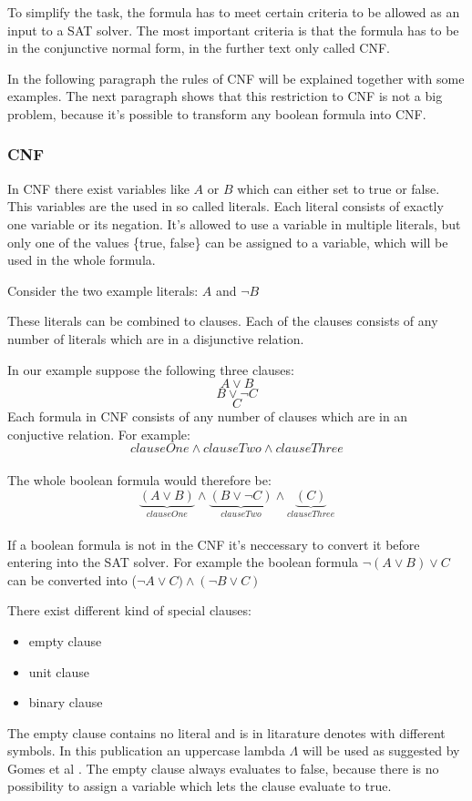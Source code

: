 To simplify the task, the formula has to meet certain criteria to be allowed as an input to a SAT solver. The most important criteria is that the formula has to be in the conjunctive normal form, in the further text only called CNF. 

In the following paragraph the rules of CNF will be explained together with some examples. The next paragraph shows that this restriction to CNF is not a big problem, because it's possible to transform any boolean formula into CNF\cite{Jackson:2004:CFC:2103144.2103160}.
\subsubsection{CNF}
In CNF there exist variables like $A$ or $B$ which can either set to true or false.
This variables are the used in so called literals. Each literal consists of exactly one variable or its negation. It's allowed to use a variable in multiple literals, but only one of the values \{true, false\} can be assigned to a variable, which will be used in the whole formula.

Consider the two example literals: $A$ and $\lnot B$

These literals can be combined to clauses. Each of the clauses consists of any number of literals which are in a disjunctive relation. 

In our example suppose the following three clauses: 
$$A \lor B$$
$$B \lor \lnot C$$ 
$$C$$
Each formula in CNF consists of any number of clauses which are in an conjuctive relation. For example: $$clauseOne \land clauseTwo \land clauseThree$$\\
The whole boolean formula would therefore be: $$\underbrace{(A \lor B)}_{clauseOne} \land \underbrace{(B \lor \lnot C)}_{clauseTwo} \land \underbrace{(C)}_{clauseThree}$$\\

If a boolean formula is not in the CNF it's neccessary to convert it before entering into the SAT solver. For example the boolean formula $\lnot(A \lor B) \lor C$ can be converted into ($\lnot A \lor C) \land (\lnot B \lor C)$

There exist different kind of special clauses:
\begin{itemize}
\item empty clause
\item unit clause
\item binary clause
\end{itemize}
The empty clause contains no literal and is in litarature denotes with different symbols. In this publication an uppercase lambda $\Lambda$  will be used as suggested by Gomes et al \cite{Gomes2008SatisfiabilityS}.
The empty clause always evaluates to false, because there is no possibility to assign a variable which lets the clause evaluate to true.

